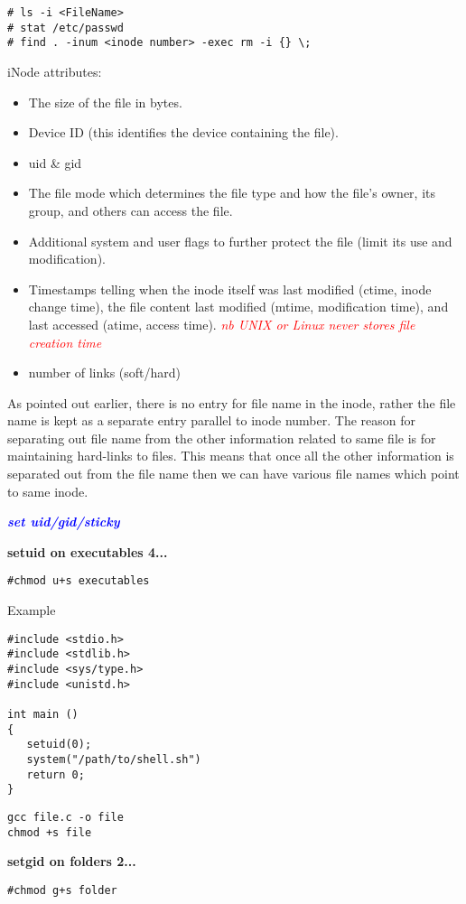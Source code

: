 \documentclass[9pt]{amsart}
\newcommand{\filldots}{\noindent \textbf {\textcolor {blue} {\dotfill}} }
\begin{document}
\begin{multicols}{2}
\begin{lstlisting}
# ls -i <FileName>
# stat /etc/passwd
# find . -inum <inode number> -exec rm -i {} \;
\end{lstlisting}

iNode attributes:
\begin{itemize}
\item The size of the file in bytes.
\item Device ID (this identifies the device containing the file).
\item uid \& gid
\item The file mode which determines the file type and how the file's owner, its group, and others can access the file.
\item Additional system and user flags to further protect the file (limit its use and modification).
\item Timestamps telling when the inode itself was last modified (ctime, inode change time), the file content last modified (mtime, modification time), and last accessed (atime, access time). \textcolor {red} {\em nb UNIX or Linux never stores file creation time}
\item number of links (soft/hard)
\end{itemize}

\noindent As pointed out earlier, there is no entry for file name in the inode, rather the file name is kept as a separate entry parallel to inode number. The reason for separating out file name from the other information related to same file is for maintaining hard-links to files. This means that once all the other information is separated out from the file name then we can have various file names which point to same inode.

\filldots
 
\noindent \textbf {\textcolor {blue} {\em set uid/gid/sticky}}

\noindent \textbf {setuid on executables 4...}

\begin{lstlisting}
#chmod u+s executables
\end{lstlisting}
Example
\begin{lstlisting}
#include <stdio.h>
#include <stdlib.h>
#include <sys/type.h>
#include <unistd.h>

int main ()
{
   setuid(0);
   system("/path/to/shell.sh")
   return 0;
}
\end{lstlisting}

\begin{lstlisting}
gcc file.c -o file
chmod +s file
\end{lstlisting}
\noindent  \textbf {setgid on folders 2...}
\begin{lstlisting}
#chmod g+s folder
\end{lstlisting}


\end{multicols}
\end{document}
